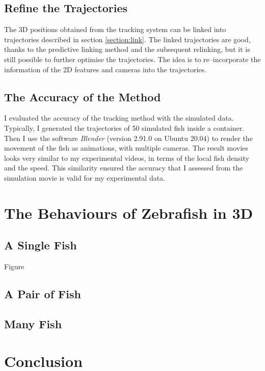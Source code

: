 \documentclass[11pt,twoside]{report}
\begin{document}
\subsection{Refine the Trajectories}

The 3D positions obtained from the tracking system can be linked into trajectories described in section \ref{section:link}. The linked trajectories are good, thanks to the predictive linking method and the subsequent relinking, but it is still possible to further optimise the trajectories. The idea is to re--incorporate the information of the 2D features and cameras into the trajectories.

\subsection{The Accuracy of the Method}

I evaluated the accuracy of the tracking method with the simulated data. Typically, I generated the trajectories of 50 simulated fish inside a container. Then I use the software \emph{Blender} (version 2.91.0 on Ubuntu 20.04) to render the movement of the fish as animations, with multiple cameras. The result movies looks very similar to my experimental videos, in terms of the local fish density and the speed. This similarity ensured the accuracy that I assessed from the simulation movie is valid for my experimental data.


\section{The Behaviours of Zebrafish in 3D}

\subsection{A Single Fish}

Figure



\subsection{A Pair of Fish}

\subsection{Many Fish}

\section{Conclusion}
\end{document}
